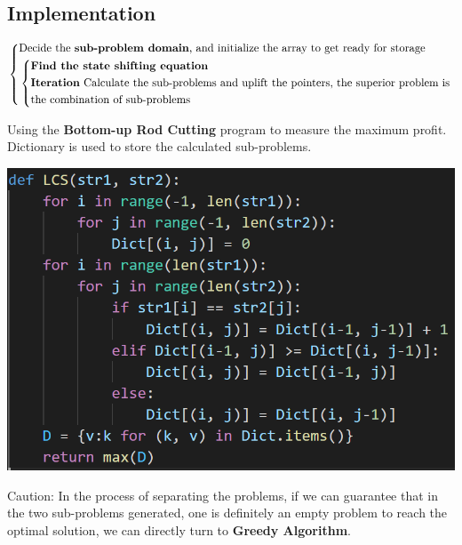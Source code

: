 \documentclass[15pt]{article}
\begin{document}
\subsection{Implementation}
\begin{equation}
\left\{
\begin{aligned}
    &\text{Decide the \textbf{sub-problem domain}, and initialize the array to get ready for storage} \\
    &\left\{
    \begin{aligned}
        &\textbf{Find  the state shifting equation}\\
        &\textbf{Iteration}~\text{Calculate the sub-problems and uplift the pointers, the superior problem is}\\
        &\text{the combination of sub-problems}         \notag\\
    \end{aligned}
    \right.
\end{aligned}
\right.
\end{equation}
\clearpage
\begin{minipage}[b]{0.45\linewidth}
Using the \textbf{Bottom-up Rod Cutting} program to measure the maximum profit. Dictionary is used to store the calculated sub-problems. \par \indent \par \indent
\end{minipage}
\hfill
\begin{minipage}[b]{0.35\linewidth}
\includegraphics[height=10\baselineskip]{Intro to Algorithm/LCS.png}
\end{minipage}
\par
Caution: In the process of separating the problems, if we can guarantee that in the two sub-problems generated, one is definitely an empty problem to reach the optimal solution, we can directly turn to \textbf{Greedy Algorithm}. 
\end{document}
